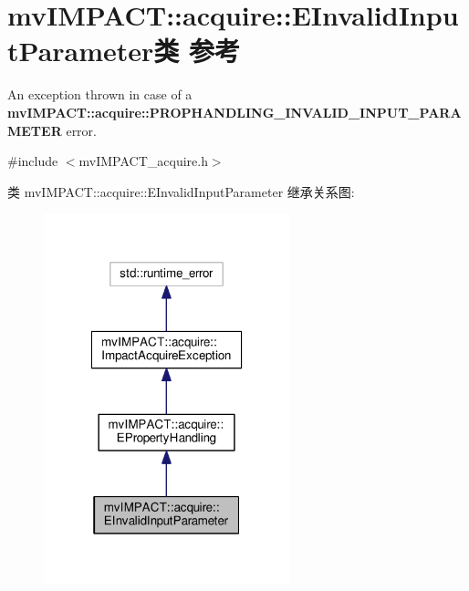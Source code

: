 \hypertarget{classmv_i_m_p_a_c_t_1_1acquire_1_1_e_invalid_input_parameter}{\section{mv\+I\+M\+P\+A\+C\+T\+:\+:acquire\+:\+:E\+Invalid\+Input\+Parameter类 参考}
\label{classmv_i_m_p_a_c_t_1_1acquire_1_1_e_invalid_input_parameter}
}


An exception thrown in case of a {\bfseries mv\+I\+M\+P\+A\+C\+T\+::acquire\+::\+P\+R\+O\+P\+H\+A\+N\+D\+L\+I\+N\+G\+\_\+\+I\+N\+V\+A\+L\+I\+D\+\_\+\+I\+N\+P\+U\+T\+\_\+\+P\+A\+R\+A\+M\+E\+T\+E\+R} error.  




{\ttfamily \#include $<$mv\+I\+M\+P\+A\+C\+T\+\_\+acquire.\+h$>$}



类 mv\+I\+M\+P\+A\+C\+T\+:\+:acquire\+:\+:E\+Invalid\+Input\+Parameter 继承关系图\+:
\nopagebreak
\begin{figure}[H]
\begin{center}
\leavevmode
\includegraphics[width=202pt]{classmv_i_m_p_a_c_t_1_1acquire_1_1_e_invalid_input_parameter__inherit__graph}
\end{center}
\end{figure}


